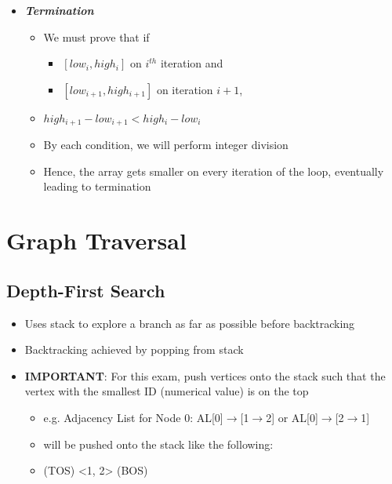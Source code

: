 \documentclass[10pt, 
a4paper, 
oneside, 
headinclude, footinclude, 
BCOR5mm]
{scrartcl}
\begin{document}
\begin{itemize}
    \item \textit{\textbf{Termination}}
    \begin{itemize}
        \item We must prove that if 
        \begin{itemize}
            \item $[low_i,high_i]$ on $i^{th}$ iteration and
            \item $[low_{i+1},high_{i+1}]$ on iteration $i+1$,
        \end{itemize}
        \item $high_{i+1}-low_{i+1}<high_{i}-low_{i}$
        \item By each condition, we will perform integer division
        \item Hence, the array gets smaller on every iteration of the loop, eventually leading to termination
    \end{itemize}
\end{itemize}
\newpage
\section{Graph Traversal}
\subsection{Depth-First Search}
\begin{itemize}
    \item Uses stack to explore a branch as far as possible before backtracking
    \item Backtracking achieved by popping from stack
    \item \textbf{IMPORTANT}: For this exam, push vertices onto the stack such that the vertex with the smallest ID (numerical value) 
    is on the top
    \begin{itemize}
        \item e.g. Adjacency List for Node 0: AL[0]$\rightarrow$[1$\rightarrow$2] or AL[0]$\rightarrow$[2$\rightarrow$1]
        \item will be pushed onto the stack like the following:
        \item (TOS) <1, 2> (BOS)
    \end{itemize}
\end{itemize}
\end{document}

